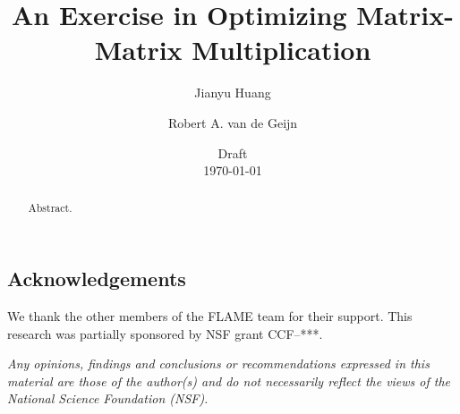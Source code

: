 \documentclass{article}
\begin{document}
\title{
An Exercise in Optimizing Matrix-Matrix Multiplication
}

\author{
Jianyu Huang
\and
Robert A. van de Geijn
}

\date{Draft \\ \today}

\maketitle 

\begin{abstract}
Abstract.
\end{abstract}





\subsection*{Acknowledgements}
We thank the other members of the FLAME team for their support.
This research was partially sponsored by NSF grant CCF--***.

{\em Any opinions, findings and conclusions or recommendations
expressed in this material are those of the author(s) and do not
necessarily reflect the views of the National Science Foundation
(NSF).}


 

\end{document}
